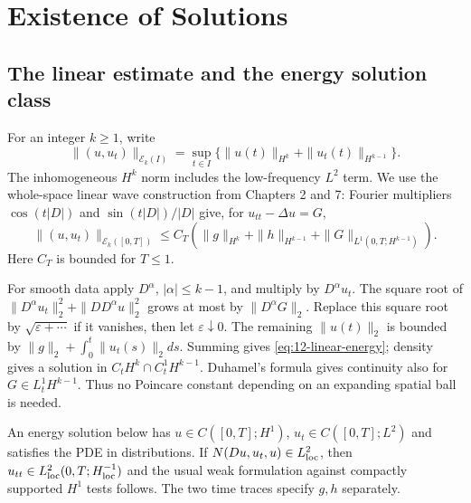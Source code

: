 \Needspace{45mm}
\section{Existence of Solutions}
\label{sec:12-2}
\subsection{The linear estimate and the energy solution class}
For an integer $k\ge1$, write
\[
 \|(u,u_t)\|_{\mathcal E_k(I)}
 =\sup_{t\in I}\{\|u(t)\|_{H^k}+\|u_t(t)\|_{H^{k-1}}\}.
\]
The inhomogeneous $H^k$ norm includes the low-frequency $L^2$ term.
We use the whole-space linear wave construction from Chapters 2 and 7:
Fourier multipliers $\cos(t|D|)$ and $\sin(t|D|)/|D|$ give, for
$u_{tt}-\Delta u=G$,
\begin{equation}\label{eq:12-linear-energy}
 \|(u,u_t)\|_{\mathcal E_k([0,T])}
 \le C_T\left(\|g\|_{H^k}+\|h\|_{H^{k-1}}
                    +\|G\|_{L^1(0,T;H^{k-1})}\right).
\end{equation}
Here $C_T$ is bounded for $T\le1$.
\begin{expandedproof}
For smooth data apply $D^\alpha$, $|\alpha|\le k-1$, and multiply
by $D^\alpha u_t$. The square root of
$\|D^\alpha u_t\|_2^2+\|DD^\alpha u\|_2^2$ grows at most by
$\|D^\alpha G\|_2$. Replace this square root by
$\sqrt{\varepsilon+\cdots}$ if it vanishes, then let $\varepsilon\downarrow0$.
The remaining $\|u(t)\|_2$ is bounded by
$\|g\|_2+\int_0^t\|u_t(s)\|_2ds$.
Summing gives \eqref{eq:12-linear-energy}; density gives a solution
in $C_tH^k\cap C_t^1H^{k-1}$. Duhamel's formula gives continuity
also for $G\in L^1_tH^{k-1}$. Thus no Poincare constant depending
on an expanding spatial ball is needed.
\end{expandedproof}

An energy solution below has $u\in C([0,T];H^1)$,
$u_t\in C([0,T];L^2)$ and satisfies the PDE in distributions.
If $N(Du,u_t,u)\in L^2_{\rm loc}$, then
$u_{tt}\in L^2_{\rm loc}(0,T;H^{-1}_{\rm loc})$ and the usual
weak formulation against compactly supported $H^1$ tests follows.
The two time traces specify $g,h$ separately.

